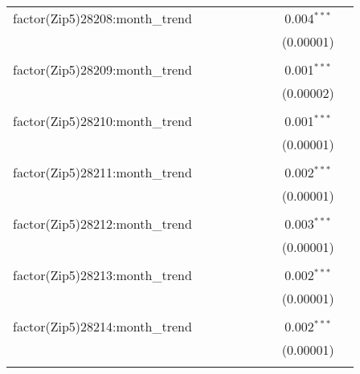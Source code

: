 \begin{table}[H]
{\begin{tabular}{@{\extracolsep{5pt}}lcccccccc}
  factor(Zip5)28208:month\_trend &  &  &  &  &  &  & 0.004$^{***}$ &  \\  

   &  &  &  &  &  &  & (0.00001) &  \\  

   & & & & & & & & \\  

  factor(Zip5)28209:month\_trend &  &  &  &  &  &  & 0.001$^{***}$ &  \\  

   &  &  &  &  &  &  & (0.00002) &  \\  

   & & & & & & & & \\  

  factor(Zip5)28210:month\_trend &  &  &  &  &  &  & 0.001$^{***}$ &  \\  

   &  &  &  &  &  &  & (0.00001) &  \\  

   & & & & & & & & \\  

  factor(Zip5)28211:month\_trend &  &  &  &  &  &  & 0.002$^{***}$ &  \\  

   &  &  &  &  &  &  & (0.00001) &  \\  

   & & & & & & & & \\  

  factor(Zip5)28212:month\_trend &  &  &  &  &  &  & 0.003$^{***}$ &  \\  

   &  &  &  &  &  &  & (0.00001) &  \\  

   & & & & & & & & \\  

  factor(Zip5)28213:month\_trend &  &  &  &  &  &  & 0.002$^{***}$ &  \\  

   &  &  &  &  &  &  & (0.00001) &  \\  

   & & & & & & & & \\  

  factor(Zip5)28214:month\_trend &  &  &  &  &  &  & 0.002$^{***}$ &  \\  

   &  &  &  &  &  &  & (0.00001) &  \\  

   & & & & & & & & \\  


\end{tabular}}
\end{table}
